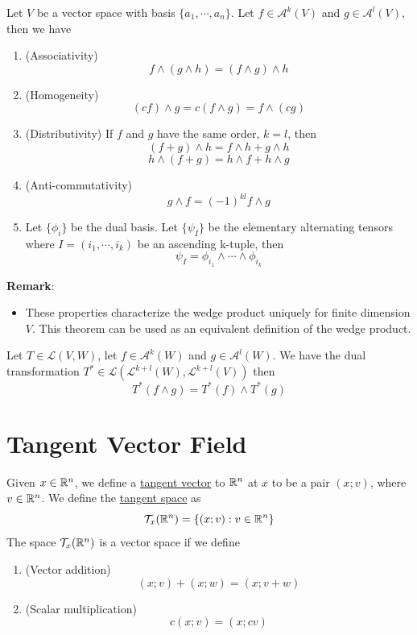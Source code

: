 \begin{theorem}
    Let $V$ be a vector space with basis $\{a_1,\cdots,a_n\}$. Let $f\in\mathcal{A}^k(V)$ and $g\in\mathcal{A}^l(V)$, then we have 
    \begin{enumerate}
        \item (Associativity) $$f\wedge (g\wedge h)=(f\wedge g)\wedge h$$
        \item (Homogeneity) $$(cf)\wedge g=c(f\wedge g)=f\wedge(cg)$$
        \item (Distributivity) If $f$ and $g$ have the same order, $k=l$, then $$(f+g)\wedge h=f\wedge h + g\wedge h$$ $$h\wedge(f+g)=h\wedge f +h\wedge g$$
        \item (Anti-commutativity) $$g\wedge f=(-1)^{kl}f\wedge g$$
        \item Let $\{\phi_i\}$ be the dual basis. Let $\{\psi_I\}$ be the elementary alternating tensors where $I=(i_1,\cdots,i_k)$ be an ascending k-tuple, then $$\psi_I=\phi_{i_1}\wedge \cdots \wedge\phi_{i_k}$$
    \end{enumerate}
\end{theorem}
\noindent\textbf{Remark}:
\begin{itemize}
    \item These properties characterize the wedge product uniquely for finite dimension $V$. This theorem can be used as an equivalent definition of the wedge product.
\end{itemize}

\begin{theorem}
    Let $T\in\mathcal{L}(V,W)$, let $f\in\mathcal{A}^k(W)$ and $g\in\mathcal{A}^l(W)$. We have the dual transformation $T^*\in\mathcal{L}(\mathcal{L}^{k+l}(W),\mathcal{L}^{k+l}(V))$ then $$T^*(f\wedge g)=T^*(f)\wedge T^*(g)$$
\end{theorem}

\section{Tangent Vector Field}

\begin{definition}
    Given $x\in \mathbb{R}^n$, we define a \underline{tangent vector} to $\mathbb{R}^n$ at $x$ to be a pair $(x;v)$, where $v\in \mathbb{R}^n$. We define the \underline{tangent space} as $$\mathcal{T}_x(\mathbb{R}^n)=\{(x;v): v\in \mathbb{R}^n\}$$
    The space $\mathcal{T}_x(\mathbb{R}^n)$ is a vector space if we define 
    \begin{enumerate}
        \item (Vector addition) $$(x;v)+(x;w)=(x;v+w)$$
        \item (Scalar multiplication) $$c(x;v)=(x;cv)$$
    \end{enumerate}
\end{definition}


